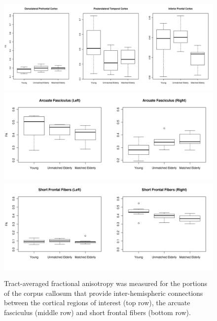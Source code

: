 \begin{figure}
\begin{center}
\includegraphics[width=1.0\linewidth]{figures/commissural.png}\\
\includegraphics[width=0.8\linewidth]{figures/arcuate.png}\\
\includegraphics[width=0.8\linewidth]{figures/short.png}
\caption{Tract-averaged fractional anisotropy was measured for the portions of the corpus callosum that provide inter-hemispheric connections between the cortical regions of interest (top row), the arcuate fasciculus (middle row) and short frontal fibers (bottom row). }
\label{fig:fa}
\end{center}
\end{figure}

